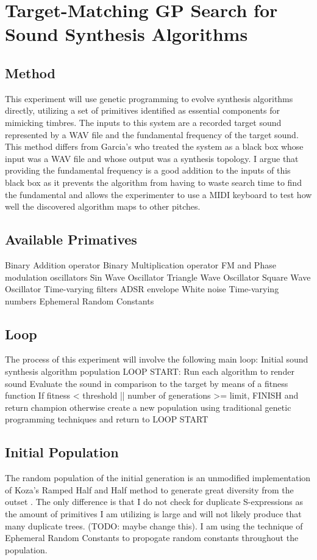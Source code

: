 \documentclass[12pt]{article}
\begin{document}
\section{Target-Matching GP Search for Sound Synthesis Algorithms}
\subsection{Method}
This experiment will use genetic programming to evolve synthesis algorithms directly, utilizing a set of primitives identified as essential components for mimicking timbres. The inputs to this system are a recorded target sound represented by a WAV file and the fundamental frequency of the target sound. This method differs from Garcia's who treated the system as a black box whose input was a WAV file and whose output was a synthesis topology. I argue that providing the fundamental frequency is a good addition to the inputs of this black box as it prevents the algorithm from having to waste search time to find the fundamental and allows the experimenter to use a MIDI keyboard to test how well the discovered algorithm maps to other pitches.
\subsection{Available Primatives}
Binary Addition operator
Binary Multiplication operator
FM and Phase modulation oscillators
Sin Wave Oscillator
Triangle Wave Oscillator
Square Wave Oscillator
Time-varying filters
ADSR envelope
White noise
Time-varying numbers
Ephemeral Random Constants
\subsection{Loop}
The process of this experiment will involve the following main loop:
Initial sound synthesis algorithm population
LOOP START:
Run each algorithm to render sound
Evaluate the sound in comparison to the target by means of a fitness function
If fitness < threshold || number of generations >= limit, FINISH and return champion
otherwise create a new population using traditional genetic programming techniques and return to LOOP START
\subsection{Initial Population}
The random population of the initial generation is an unmodified implementation of Koza's Ramped Half and Half method to generate great diversity from the outset \citep{koza1992genetic}. The only difference is that I do not check for duplicate S-expressions as the amount of primitives I am utilizing is large and will not likely produce that many duplicate trees. (TODO: maybe change this). I am using the technique of Ephemeral Random Constants to propogate random constants throughout the population.
\end{document}
